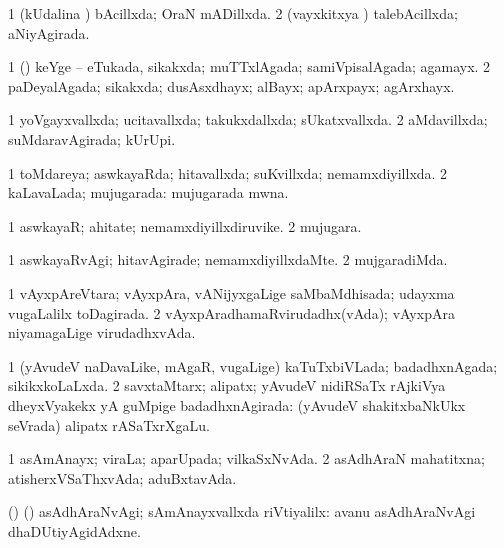 {\bentry
{} 
\gl{\gu}
\expl{}
\bmng
\bnum
\num{1} (kUdalina \vi) bAcillxda; OraN mADillxda. 
\num{2} (vayxkitxya \vi) talebAcillxda; aNiyAgirada. 
\enum
\emng
\eentry

\bentry
{} 
\gl{\gu}
\expl{}
\bmng
\bnum
\num{1} (\AmA) keYge -- eTukada, sikakxda; muTTxlAgada; samiVpisalAgada; agamayx. 
\num{2} paDeyalAgada; sikakxda; dusAsxdhayx; alBayx; apArxpayx; agArxhayx. 
\enum
\emng
\eentry

\bentry
{} 
\gl{\gu}
\expl{}
\bmng
\bnum
\num{1} yoVgayxvallxda; ucitavallxda; takukxdallxda; sUkatxvallxda. 
\num{2} aMdavillxda; suMdaravAgirada; kUrUpi. 
\enum
\emng
\eentry

\bentry
{} 
\gl{\gu}
\expl{}
\bmng
\bnum
\num{1} toMdareya; aswkayaRda; hitavallxda; suKvillxda; nemamxdiyillxda. 
\num{2} kaLavaLada; mujugarada:  mujugarada mwna. 
\enum
\emng
\eentry

\bentry
{} 
\gl{\nA}
\expl{}
\bmng
\bnum
\num{1} aswkayaR; ahitate; nemamxdiyillxdiruvike. 
\num{2} mujugara. 
\enum
\emng
\eentry

\bentry
{} 
\gl{\kirxvi}
\expl{}
\bmng
\bnum
\num{1} aswkayaRvAgi; hitavAgirade; nemamxdiyillxdaMte. 
\num{2} mujgaradiMda. 
\enum
\emng
\eentry

\bentry
{}
\gl{\gu}
\expl{}
\bmng
\bnum
\num{1} vAyxpAreVtara; vAyxpAra, vANijyxgaLige saMbaMdhisada; udayxma \mo vugaLalilx toDagirada. 
\num{2} vAyxpAradhamaRvirudadhx(vAda); vAyxpAra niyamagaLige virudadhxvAda. 
\enum
\emng
\eentry

\bentry
{} 
\gl{\gu}
\expl{}
\bmng
\bnum
\num{1} (yAvudeV naDavaLike, mAgaR, \mo vugaLige) kaTuTxbiVLada; badadhxnAgada; sikikxkoLaLxda. 
\num{2} savxtaMtarx; alipatx; yAvudeV nidiRSaTx rAjkiVya dheyxVyakekx yA guMpige badadhxnAgirada:  (yAvudeV shakitxbaNkUkx seVrada) alipatx rASaTxrXgaLu. 
\enum
\emng
\eentry

\bentry
{} 
\gl{\gu}
\expl{}
\bmng
\bnum
\num{1} asAmAnayx; viraLa; aparUpada; vilkaSxNvAda. 
\num{2} asAdhAraN mahatitxna; atisherxVSaThxvAda; aduBxtavAda. 
\enum
\emng
\eentry

\bentry
{}
\gl{\kirxvi}
\expl{}
\bmng
 (\pArxparx) (\AmA) asAdhAraNvAgi; sAmAnayxvallxda riVtiyalilx:  avanu asAdhAraNvAgi dhaDUtiyAgidAdxne. 
\emng
\eentry

}
